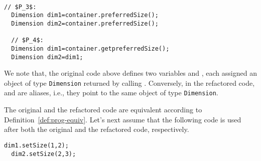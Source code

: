 \documentclass[sigconf,review,anonymous]{acmart}
\begin{document}
\begin{example}\label{ex:aliasing}
~\begin{lstlisting}[mathescape=true,showstringspaces=false]
  // $P_3$:
  Dimension dim1=container.preferredSize();
  Dimension dim2=container.preferredSize();    

  // $P_4$:
  Dimension dim1=container.getpreferredSize();  
  Dimension dim2=dim1;
\end{lstlisting}



    




We note that, the original code above defines two variables  and
, each assigned an object of type \lstinline[breaklines=true]{Dimension} returned by calling
.
Conversely, in the refactored code,  and  are aliases,
i.e., they point to the same
object of type \lstinline[breaklines=true]{Dimension}.

The original and the refactored code are equivalent according to Definition~\ref{def:prog-equiv}.
Let's next assume that the following code
is used after both the original and the refactored code, respectively.

\begin{lstlisting}[mathescape=true,showstringspaces=false]
  dim1.setSize(1,2);
  dim2.setSize(2,3);  
\end{lstlisting}


\end{example}
\end{document}
